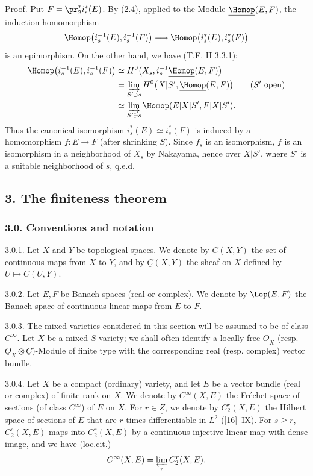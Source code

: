 \uline{Proof.} Put $F=\pr_2^*i_s^*(E)$. By (2.4), applied to the Module $\underline{\Homop}(E,F)$, the induction homomorphism
\[
  \Homop\bigl(i_s^{-1}(E),i_s^{-1}(F)\bigr)
  \longrightarrow
  \Homop\bigl(i_s^*(E),i_s^*(F)\bigr)
\]
%
is an epimorphism. On the other hand, we have (T.F. II 3.3.1):
\[
\begin{aligned}
  \Homop\bigl(i_s^{-1}(E),i_s^{-1}(F)\bigr)
  &\simeq H^0\bigl(X_s,i_s^{-1}\underline{\Homop}(E,F)\bigr)\\
  &=\varinjlim_{S'\ni s} H^0\bigl(X|S',\underline{\Homop}(E,F)\bigr)\qquad (S'\ \text{open})\\
  &\simeq \varinjlim_{S'\ni s}\Homop(E|X|S',F|X|S').
\end{aligned}
\]
Thus the canonical isomorphism $i_s^*(E)\simeq i_s^*(F)$ is induced by a homomorphism $f:E\to F$ (after shrinking $S$). Since $f_s$ is an isomorphism, $f$ is an isomorphism in a neighborhood of $X_s$ by Nakayama, hence over $X|S'$, where $S'$ is a suitable neighborhood of $s$, q.e.d.

\subsection*{3. The finiteness theorem}

\subsubsection*{3.0. Conventions and notation}
3.0.1. Let $X$ and $Y$ be topological spaces. We denote by $C(X,Y)$ the set of continuous maps from $X$ to $Y$, and by $\underline C(X,Y)$ the sheaf on $X$ defined by $U\mapsto C(U,Y)$.

3.0.2. Let $E,F$ be Banach spaces (real or complex). We denote by $\Lop(E,F)$ the Banach space of continuous linear maps from $E$ to $F$.

3.0.3. The mixed varieties considered in this section will be assumed to be of class $C^\infty$. Let $X$ be a mixed $S$-variety; we shall often identify a locally free $\underline{O}_X$ (resp. $\underline{O}_X\otimes\underline{\underline{C}}$)-Module of finite type with the corresponding real (resp. complex) vector bundle.

3.0.4. Let $X$ be a compact (ordinary) variety, and let $E$ be a vector bundle (real or complex) of finite rank on $X$. We denote by $C^\infty(X,E)$ the Fréchet space of sections (of class $C^\infty$) of $E$ on $X$. For $r\in\underline{\underline{Z}}$, we denote by $C^r_2(X,E)$ the Hilbert space of sections of $E$ that are $r$ times differentiable in $L^2$ ([16]~IX). For $s\ge r$, $C^s_2(X,E)$ maps into $C^r_2(X,E)$ by a continuous injective linear map with dense image, and we have
%
(loc.cit.)
\[
  C^\infty(X,E)=\varprojlim_r C^r_2(X,E).
\]

